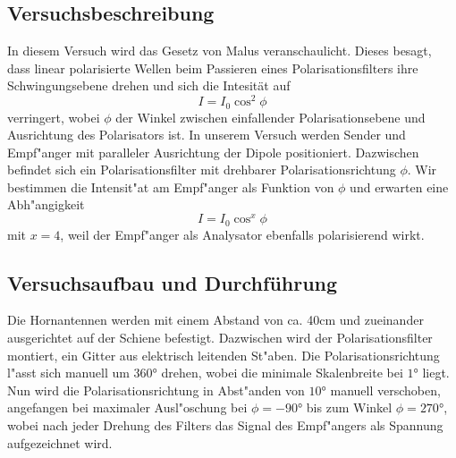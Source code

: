 \documentclass[12pt,a4paper]{article}
\begin{document}
\subsection{Versuchsbeschreibung}
In diesem Versuch wird das Gesetz von Malus veranschaulicht. Dieses besagt, dass linear polarisierte Wellen beim Passieren eines Polarisationsfilters ihre Schwingungsebene drehen und sich die Intesität auf
\begin{equation}
I=I_0\cos^2{\phi}
\end{equation}
verringert, wobei $\phi$ der Winkel zwischen einfallender Polarisationsebene und Ausrichtung des Polarisators ist. In unserem Versuch werden Sender und Empf"anger mit paralleler Ausrichtung der Dipole positioniert. Dazwischen befindet sich ein Polarisationsfilter mit drehbarer Polarisationsrichtung $\phi$. Wir bestimmen die Intensit"at am Empf"anger als Funktion von $\phi$ und erwarten eine Abh"angigkeit
\begin{equation}\label{eq:MalusGesetzx}
I=I_0\cos^x{\phi}
\end{equation}
mit $x=4$, weil der Empf"anger als Analysator ebenfalls polarisierend wirkt.
\subsection{Versuchsaufbau und Durchführung}
Die Hornantennen werden mit einem Abstand von ca. 40cm und zueinander ausgerichtet auf der Schiene befestigt. Dazwischen wird der Polarisationsfilter montiert, ein Gitter aus elektrisch leitenden St"aben. Die Polarisationsrichtung l"asst sich manuell um $\ang{360}$ drehen, wobei die minimale Skalenbreite bei $\ang{1}$ liegt. Nun wird die Polarisationsrichtung in Abst"anden von $\ang{10}$ manuell verschoben, angefangen bei maximaler Ausl"oschung bei $\phi=-\ang{90}$ bis zum Winkel $\phi=\ang{270}$, wobei nach jeder Drehung des Filters das Signal des Empf"angers als Spannung aufgezeichnet wird.
\end{document}
